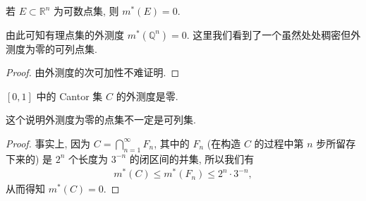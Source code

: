 \documentclass[../../main.tex]{subfiles}
\begin{document}
\begin{corollary}
若 \(E \subset \mathbb{R}^n\) 为可数点集, 则 \(m^*(E) = 0\).
\end{corollary}
\begin{remark}
由此可知有理点集的外测度 \(m^*(\mathbb{Q}^n)=0\). 这里我们看到了一个虽然处处稠密但外测度为零的可列点集.
\end{remark}
\begin{proof}
由外测度的次可加性不难证明.

\end{proof}

\begin{proposition}\label{proposition:Cantor集的外测度是零}
\([0,1]\) 中的 Cantor 集 \(C\) 的外测度是零.
\end{proposition}
\begin{remark}
这个说明外测度为零的点集不一定是可列集.
\end{remark}
\begin{proof}
事实上, 因为 \(C = \bigcap_{n = 1}^{\infty} F_n\), 其中的 \(F_n\) (在构造 \(C\) 的过程中第 \(n\) 步所留存下来的) 是 \(2^n\) 个长度为 \(3^{-n}\) 的闭区间的并集, 所以我们有
\begin{align*}
m^*(C) \leqslant  m^*(F_n) \leqslant  2^n \cdot 3^{-n},
\end{align*}
从而得知 \(m^*(C)=0\). 

\end{proof}
\end{document}
